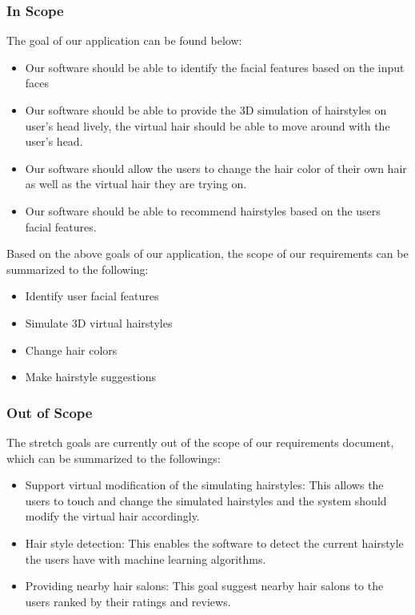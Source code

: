 \documentclass[12pt]{article}
\begin{document}
 \subsubsection{In Scope}
The goal of our application can be found below:
 \begin{itemize}
     \item Our software should be able to identify the facial features based on the input faces
     \item Our software should be able to provide the 3D simulation of hairstyles on user's head lively, the virtual hair should be able to move around with the user's head.
     \item Our software should allow the users to change the hair color of their own hair as well as the virtual hair they are trying on.
     \item Our software should be able to recommend hairstyles based on the users facial features.
 \end{itemize}
 
 \noindent
 Based on the above goals of our application, the scope of our requirements can be summarized to the following:
 \begin{itemize}
     \item Identify user facial features
     \item Simulate 3D virtual hairstyles
     \item Change hair colors
     \item Make hairstyle suggestions
 \end{itemize}

\subsubsection{Out of Scope}

The stretch goals are currently out of the scope of our requirements document, which can be summarized to the followings:

\begin{itemize}
    \item Support virtual modification of the simulating hairstyles: This allows the users to touch and change the simulated hairstyles and the system should modify the virtual hair accordingly.
    \item Hair style detection: This enables the software to detect the current hairstyle the users have with machine learning algorithms.
    \item Providing nearby hair salons: This goal suggest nearby hair salons to the users ranked by their ratings and reviews.
\end{itemize}
\end{document}
